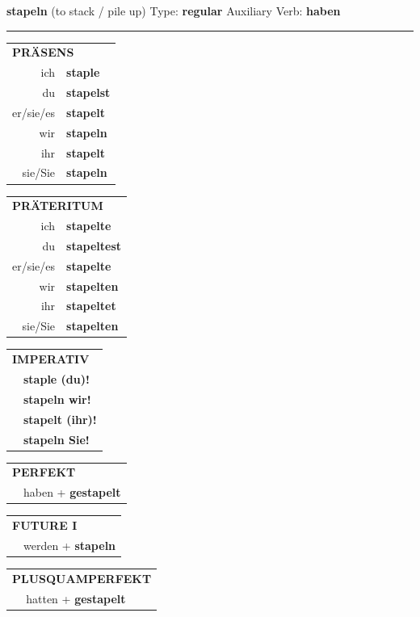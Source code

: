 \documentclass[10pt,a4paper]{revtex4-2}
\begin{document}
\begin{verbbox}
{\Large \bf stapeln} (to stack / pile up) \hfill Type: \textbf{regular} \hfill Auxiliary Verb: \textbf{haben}

\vspace{5pt}
\hrule
\vspace{5pt}

\begin{tabular}{rl}
\multicolumn{2}{l}{\textbf{PRÄSENS}}\\
ich & \textbf{staple}\\
du & \textbf{stapelst}\\
er/sie/es & \textbf{stapelt}\\
wir & \textbf{stapeln}\\
ihr & \textbf{stapelt}\\
sie/Sie & \textbf{stapeln}\\
\end{tabular}
\hfill
\begin{tabular}{rl}
\multicolumn{2}{l}{\textbf{PRÄTERITUM}}\\
ich & \textbf{stapelte}\\
du & \textbf{stapeltest}\\
er/sie/es & \textbf{stapelte}\\
wir & \textbf{stapelten}\\
ihr & \textbf{stapeltet}\\
sie/Sie & \textbf{stapelten}\\
\end{tabular}
\hfill
\begin{tabular}{rl}
\multicolumn{2}{l}{\textbf{IMPERATIV}}\\
& \textbf{staple (du)!}\\
& \textbf{stapeln wir!}\\
& \textbf{stapelt (ihr)!}\\
& \textbf{stapeln Sie!}\\
\end{tabular}

\vspace{10pt}

\begin{tabular}{rl}
\multicolumn{2}{l}{\textbf{PERFEKT}}\\
& haben + \textbf{gestapelt}\\
\end{tabular}
\hfill
\begin{tabular}{rl}
\multicolumn{2}{l}{\textbf{FUTURE I}}\\
& werden + \textbf{stapeln}\\
\end{tabular}
\hfill
\begin{tabular}{rl}
\multicolumn{2}{l}{\textbf{PLUSQUAMPERFEKT}}\\
& hatten + \textbf{gestapelt}\\
\end{tabular}


\end{verbbox}
\end{document}
